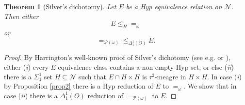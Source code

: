 \documentclass[11pt, english]{article}
\newtheorem{thm}{Theorem}
\newcommand{\baire}{\mathscr N}
\begin{document}
\begin{thm}[Silver's dichotomy]
Let $E$ be a Hyp equivalence relation on $\baire$. Then
either
$$
E\leq_{H} =_{\omega}
$$
or
$$
=_{\mathcal{P}(\omega)}\leq_{\Delta^1_1(O)} E.
$$
\label{silver}
\end{thm}
\begin{proof}
By Harrington's well-known proof of Silver's dichotomy (see e.g.
\cite[Theorem 32.1]{jech03} or \cite[Theorem 5.3.5]{gao09}),
either ({\it i}) every $E$-equivalence class contains a non-empty
Hyp set, or else ({\it ii}) there is a $\Sigma^1_1$ set
$H\subseteq\baire$ such that $E\cap H\times H$ is $\tau^2$-meagre
in $H\times H$. In case ({\it i}) by Proposition \ref{prop2} there is a
Hyp reduction of $E$ to $=_{\omega}$. We show that in case ({\it ii}) there is a $\Delta^1_1(O)$ reduction of
$=_{\mathcal{P}(\omega)}$ to $E$.



\end{proof}
\end{document}
